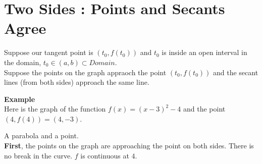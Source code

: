 \documentclass{ximera}
\begin{document}
\section{Two Sides : Points and Secants Agree}


Suppose our tangent point is $(t_0 , f(t_0))$ and $t_0$ is inside an open interval in the domain, $t_0 \in (a, b) \subset Domain$. \\


Suppose the points on the graph appraoch the point $(t_0 , f(t_0))$ and the secant lines (from both sides) approach the same line.



\textbf{\textcolor{blue!55!black}{Example}}  \\




Here is the graph of the function $f(x) = (x - 3)^2 - 4$ and the point $(4, f(4))= (4, -3)$. \\

\begin{image}
\end{image}

A parabola and a point. \\


\textbf{First}, the points on the graph are approaching the point on both sides.  There is no break in the curve. $f$ is continuous at $4$.\\
\end{document}

